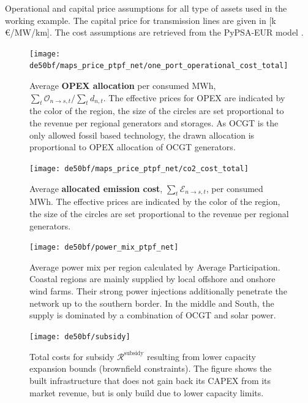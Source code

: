 \documentclass[11pt,twocolumn]{article}
\newcommand{\demand}[1][n]{d_{#1,t}}
\newcommand{\opex}{\mathcal{O}}
\newcommand{\emissioncost}{\mathcal{E}}
\newcommand{\remainingcost}{\mathcal{R}}
\newcommand{\subsidycost}{\remainingcost^\text{subsidy}}
\newcommand{\allocateopex}[1][n \rightarrow s]{\opex_{#1,t}}
\newcommand{\allocateemissioncost}[1][n \rightarrow s]{\emissioncost_{#1,t}}
\begin{document}
\begin{table}[h]
    \centering
        
    \caption{Operational and capital price assumptions for all type of assets used in the working example. The capital price for transmission lines are given in [k\,\euro/MW/km]. The cost assumptions are retrieved from the PyPSA-EUR model \cite{horsch_jonas_pypsa-eur_2020}.}
    \label{tab:cost_assumptions}
\end{table} 

\begin{figure}
    \texttt{[image: de50bf/maps\_price\_ptpf\_net/one\_port\_operational\_cost\_total]}
    \caption{Average \textbf{OPEX allocation} per consumed MWh, $\sum_t \allocateopex/\sum_t \demand$. The effective prices for OPEX are indicated by the color of the region, the size of the circles are set proportional to the revenue per regional generators and storages. As OCGT is the only allowed fossil based technology, the drawn allocation is proportional to OPEX allocation of OCGT generators.}
    \label{fig:opex_price}
\end{figure}


\begin{figure}
    \texttt{[image: de50bf/maps\_price\_ptpf\_net/co2\_cost\_total]}
    \caption{Average \textbf{allocated emission cost}, $\sum_t \allocateemissioncost$, per consumed MWh. The effective prices are indicated by the color of the region, the size of the circles are set proportional to the revenue per regional generators.}
    \label{fig:emission_cost}
\end{figure}


\begin{figure}
    \texttt{[image: de50bf/power\_mix\_ptpf\_net]}
    \caption{Average power mix per region calculated by Average Participation. Coastal regions are mainly supplied by local offshore and onshore wind farms. Their strong power injections additionally penetrate the network up to the southern border. In the middle and South, the supply is dominated by a combination of OCGT and solar power.}
    \label{fig:power_mix}
\end{figure}

\begin{figure}
    \vspace{2cm}
    \texttt{[image: de50bf/subsidy]}
    \caption{Total costs for subsidy $\subsidycost$ resulting from lower capacity expansion bounds (brownfield constraints). The figure shows the built infrastructure that does not gain back its CAPEX from its market revenue, but is only build due to lower capacity limits.}
    \label{fig:subsidy}
\end{figure}
\end{document}
